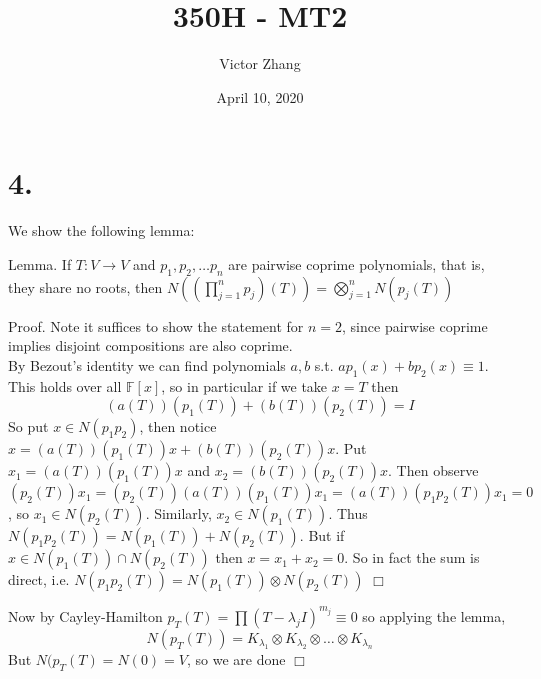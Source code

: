 \documentclass{article}
\title{350H - MT2}
\author{Victor Zhang}
\date{April 10, 2020}
\newenvironment{myindentpar}[2]
  {\begin{list}{}
          {\setlength{\leftmargin}{#1}
          \setlength{\rightmargin}{#2}}
          \item[]
  }
  {\end{list}}
\begin{document}
\maketitle

\section*{4.}
We show the following lemma:
\begin{myindentpar}{1em}{0em}
    Lemma. If $T: V\to V$ and $p_1, p_2, \dots p_n$ are pairwise coprime polynomials, that is, they share no roots, then $N(\left(\prod\limits_{j=1}^n p_j \right)(T)) = \bigotimes\limits_{j=1}^n N(p_j(T))$
\end{myindentpar}
\begin{myindentpar}{2em}{2em}
    Proof. Note it suffices to show the statement for $n = 2$, since pairwise coprime implies disjoint compositions are also coprime.\\
    By Bezout's identity we can find polynomials $a,b$ s.t. $ap_1(x) + bp_2(x) \equiv 1$. This holds over all $\mathbb{F}[x]$, so in particular if we take $x = T$ then
    $$(a(T))(p_1(T)) + (b(T))(p_2(T)) = I$$ 
    So put $x \in N(p_1p_2)$, then notice $x = (a(T))(p_1(T))x + (b(T))(p_2(T))x$. Put $x_1 = (a(T))(p_1(T))x$ and $x_2 = (b(T))(p_2(T))x$. Then observe $(p_2(T))x_1 = (p_2(T))(a(T))(p_1(T))x_1 = (a(T))(p_1p_2(T))x_1 = 0$, so $x_1 \in N(p_2(T))$. Similarly, $x_2 \in N(p_1(T))$. Thus $N(p_1p_2(T)) = N(p_1(T)) + N(p_2(T))$. But if $x \in N(p_1(T)) \cap N(p_2(T))$ then $x = x_1 + x_2 = 0$. So in fact the sum is direct, i.e. $N(p_1p_2(T)) = N(p_1(T)) \otimes N(p_2(T))$ $\Box$
\end{myindentpar}
Now by Cayley-Hamilton $p_T(T) = \prod (T-\lambda_j I)^{m_j} \equiv 0$ so applying the lemma,
$$N(p_T(T)) = K_{\lambda_1} \otimes K_{\lambda_2} \otimes \dots \otimes K_{\lambda_n}$$
But $N(p_T(T) = N(0) = V$, so we are done $\Box$
\end{document}

